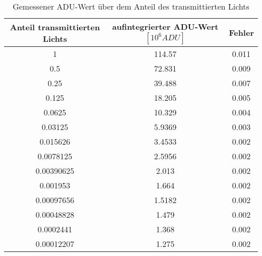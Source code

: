 \begin{table}[h!]
\centering
\begin{tabular}{c c c}
Anteil transmittierten Lichts & aufintegrierter ADU-Wert $[10^6 ADU]$ & Fehler\\
\hline
1	&114.57 & 0.011\\
0.5	&72.831 & 0.009\\
0.25	&39.488 & 0.007\\
0.125	&18.205 & 0.005\\
0.0625	&10.329 & 0.004\\
0.03125	&5.9369 & 0.003\\
0.015626	&3.4533 & 0.002\\
0.0078125	&2.5956 & 0.002\\
0.00390625	&2.013 & 0.002\\
0.001953	&1.664 & 0.002\\
0.00097656	&1.5182 & 0.002\\
0.00048828	&1.479 & 0.002\\
0.0002441	&1.368 & 0.002\\
0.00012207	&1.275  & 0.002\\
\end{tabular}
\caption{Gemessener ADU-Wert über dem Anteil des transmittierten Lichts}
\label{tbl:adu_int}
\end{table}